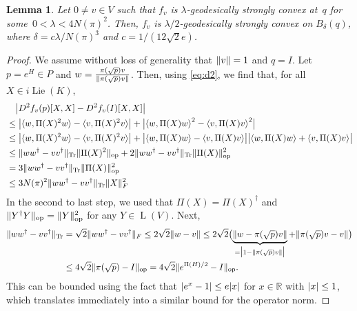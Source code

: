\documentclass{article}
\newtheorem{lemma}[theorem]{Lemma}
\DeclareMathOperator{\Lie}{Lie}
\DeclareMathOperator{\Lin}{L}
\DeclareMathOperator{\ope}{op}
\DeclarePairedDelimiter{\abs}{\lvert}{\rvert}
\DeclarePairedDelimiter{\norm}{\lVert}{\rVert}
\newcommand{\R}{{\mathbb{R}}}
\newcommand\tr{\operatorname{Tr}}
\begin{document}
\begin{lemma}\label{lem:hessian stable}
Let $0\neq v\in V$ such that $f_v$ is $\lambda$-geodesically strongly convex at~$q$ for some~$0<\lambda < 4N(\pi)^2$.
Then, $f_v$ is $\lambda/2$-geodesically strongly convex on $B_\delta(q)$, where $\delta = {c\lambda / N(\pi)^3}$ and $c = 1/(12\sqrt{2} e)$.
\end{lemma}
\begin{proof}
We assume without loss of generality that $\norm{v}=1$ and $q=I$.
Let $p = e^H\in P$ and $w = \frac {\pi(\sqrt p) v}{\norm{\pi(\sqrt p) v}}$.
Then, using \cref{eq:d2}, we find that, for all $X\in i\Lie(K)$,
\begin{equation}\label{eq:hess first}
\begin{aligned}
&\quad \abs[\big]{D^2f_v(p)[X,X] - D^2f_v(I)[X,X]} \\
&\leq \abs[\big]{\braket{w, \Pi(X)^2 w} - \braket{v, \Pi(X)^2 v}} + \abs[\big]{\braket{w, \Pi(X) w}^2 - \braket{v, \Pi(X) v}^2} \\
&\leq \abs[\big]{\braket{w, \Pi(X)^2 w} - \braket{v, \Pi(X)^2 v}} + \abs[\big]{\braket{w, \Pi(X) w} - \braket{v, \Pi(X) v}}\abs[\big]{\braket{w, \Pi(X) w} + \braket{v, \Pi(X) v}} \\
&\leq \norm{ww^\dagger - vv^\dagger}_{\tr} \norm{\Pi(X)^2}_{\ope} + 2 \norm{ww^\dagger - vv^\dagger}_{\tr} \norm{\Pi(X)}_{\ope}^2 \\
&= 3 \norm{ww^\dagger - vv^\dagger}_{\tr} \norm{\Pi(X)}^2_{\ope} \\
&\leq 3 N(\pi)^2 \norm{ww^\dagger - vv^\dagger}_{\tr} \norm{X}_F^2
\end{aligned}
\end{equation}
In the second to last step, we used that $\Pi(X) = \Pi(X)^\dagger$ and $\norm{Y^\dagger Y}_{\ope} = \norm{Y}_{\ope}^2$ for any $Y\in\Lin(V)$.
Next,
\begin{align*}
  \norm{ww^\dagger - vv^\dagger}_{\tr}
&= \sqrt2 \norm{ww^\dagger - vv^\dagger}_F
\leq 2 \sqrt2 \norm{w - v}
\leq 2 \sqrt2 \bigl( \underbrace{\norm{w - \pi(\sqrt p) v}}_{=\abs[\big]{1 - \norm{\pi(\sqrt p) v}}} + \norm{\pi(\sqrt p) v - v} \bigr) \\
&\leq 4 \sqrt2 \norm{\pi(\sqrt p) - I}_{\ope}
= 4 \sqrt2 \norm{e^{\Pi(H)/2} - I}_{\ope}.
\end{align*}
This can be bounded using the fact that $\abs{e^x - 1} \leq e \abs x$ for $x\in\R$ with $\abs x \leq 1$, which translates immediately into a similar bound for the operator norm.

\end{proof}
\end{document}
